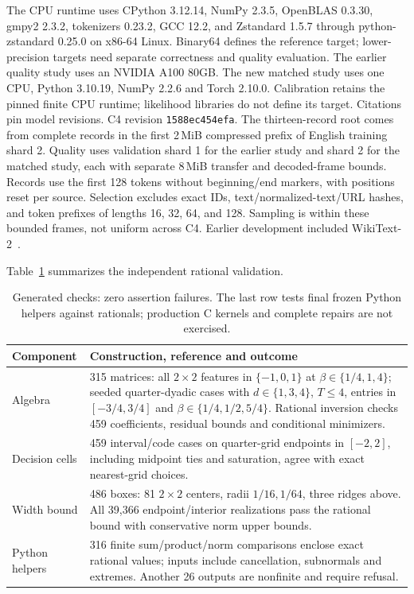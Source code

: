 \documentclass[11pt,a4paper]{article}
\makeatletter
\def\paragraph{\@startsection{paragraph}{4}{\z@}{1.5ex plus
   0.5ex minus .2ex}{-1em}{\normalsize\bf}}
\makeatother
\begin{document}
\paragraph{Implementation and data.}
The CPU runtime uses CPython 3.12.14, NumPy 2.3.5, OpenBLAS 0.3.30,
gmpy2 2.3.2, tokenizers 0.23.2, GCC 12.2, and Zstandard 1.5.7 through python-zstandard 0.25.0
on x86-64 Linux. Binary64 defines the reference target; lower-precision targets
need separate correctness and quality evaluation. The earlier quality study uses an NVIDIA A100 80GB. The new matched study
uses one CPU, Python 3.10.19, NumPy 2.2.6 and Torch 2.10.0. Calibration retains
the pinned finite CPU runtime; likelihood libraries do not define its target.
Citations pin model revisions. C4 revision \texttt{1588ec454efa}. The thirteen-record root comes from
complete records in the first 2\,MiB compressed prefix of English training
shard 2. Quality uses validation shard 1 for the earlier study and shard 2 for the
matched study, each with separate 8\,MiB transfer and decoded-frame bounds.
Records use the first 128 tokens without beginning/end markers, with positions
reset per source. Selection excludes exact IDs, text/normalized-text/URL hashes,
and token prefixes of lengths 16, 32, 64, and 128. Sampling is within these bounded
frames, not uniform across C4. Earlier development included WikiText-2~\citep{wikitext}.

Table~\ref{tab:checks} summarizes the independent rational validation.
\begin{table}[t]
\centering\small
\begin{tabular}{@{}p{}p{}@{}}
\toprule
Component & Construction, reference and outcome \\
\midrule
Algebra & 315 matrices: all $2\!\times\!2$ features in $\{-1,0,1\}$ at
$\beta\in\{1/4,1,4\}$; seeded quarter-dyadic cases with $d\in\{1,3,4\}$,
$T\leq4$, entries in $[-3/4,3/4]$ and $\beta\in\{1/4,1/2,5/4\}$. Rational inversion checks 459 coefficients, residual bounds and
conditional minimizers. \\
Decision cells & 459 interval/code cases on quarter-grid endpoints in $[-2,2]$,
including midpoint ties and saturation, agree with exact nearest-grid choices. \\
Width bound & 486 boxes: 81 $2\!\times\!2$ centers, radii $1/16,1/64$, three
ridges above. All 39,366 endpoint/interior realizations pass the rational bound
with conservative norm upper bounds. \\
Python helpers & 316 finite sum/product/norm comparisons enclose exact rational
values; inputs include cancellation, subnormals and extremes. Another 26 outputs
are nonfinite and require refusal. \\
\bottomrule
\end{tabular}
\caption{Generated checks: zero assertion failures. The last row tests final
frozen Python helpers against rationals; production C kernels and complete
repairs are not exercised.}
\label{tab:checks}
\end{table}
\end{document}
